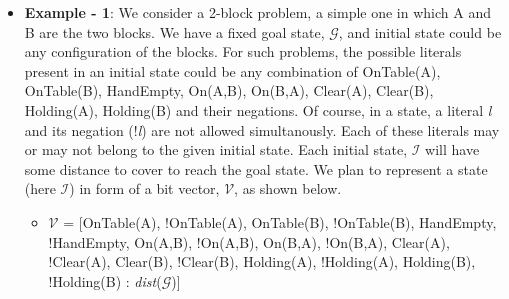 \documentclass[]{article}
\begin{document}
\begin{itemize}
%
\item[] \noindent \textbf{Example - 1}: We consider a 2-block problem, a simple one in which A and B are the two blocks. 
We have a fixed goal state, $\mathcal{G}$, and initial state could be any configuration of the blocks. 
%
For such problems, the possible literals present in an initial state could be any combination of 
OnTable(A), OnTable(B), HandEmpty, On(A,B), On(B,A), Clear(A), Clear(B), Holding(A), Holding(B) and their negations. 
Of course, in a state, a literal \emph{l} and its negation (!\emph{l}) are not allowed simultanously. 
%
Each of these literals may or may not belong to the given initial state. Each initial state, $\mathcal{I}$ will have some distance to cover to reach the goal state. 
%
We plan to represent a state (here $\mathcal{I}$) in form of a bit vector, $\mathcal{V}$, as shown below. 
\begin{itemize}
	\item[] $\mathcal{V}$ = [OnTable(A), !OnTable(A), OnTable(B), !OnTable(B), HandEmpty, !HandEmpty, On(A,B), !On(A,B), On(B,A), !On(B,A), Clear(A), !Clear(A), Clear(B), !Clear(B), 
						Holding(A), !Holding(A), Holding(B), !Holding(B) : \emph{dist}($\mathcal{G}$)] 
\end{itemize}
%


\end{itemize}
\end{document}
